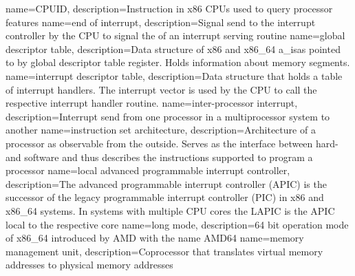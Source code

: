 
%
{
    name=CPUID,
    description={Instruction in x86 CPUs used to query processor features}
}
%
{
    name=end of interrupt,
    description={Signal send to the interrupt controller by the CPU to signal the of an interrupt serving routine}
}
%
{
    name=global descriptor table,
    description={Data structure of x86 and x86\_64 \acrshort{a_isa}s pointed to by global descriptor table register.
            Holds information about memory segments.}
}
%
{
    name=interrupt descriptor table,
    description={Data structure that holds a table of interrupt handlers. The interrupt vector is used by the CPU to
            call the respective interrupt handler routine.}
}
{
    name=inter-processor interrupt,
    description={Interrupt send from one processor in a multiprocessor system to another}
}
{
    name=instruction set architecture,
    description={Architecture of a processor as observable from the outside. Serves as the interface between hard- and
            software and thus describes the instructions supported to program a processor}
}
%
{
    name=local advanced programmable interrupt controller,
    description={The advanced programmable interrupt controller (APIC) is the successor of the legacy programmable
            interrupt controller (PIC) in x86 and x86\_64 systems. In systems with multiple CPU cores the LAPIC is the
            APIC local to the respective core}
}
{
    name=long mode,
    description={64 bit operation mode of x86\_64 introduced by AMD with the name AMD64}
}
%
{
    name=memory management unit,
    description={Coprocessor that translates virtual memory addresses to physical memory addresses}
}
